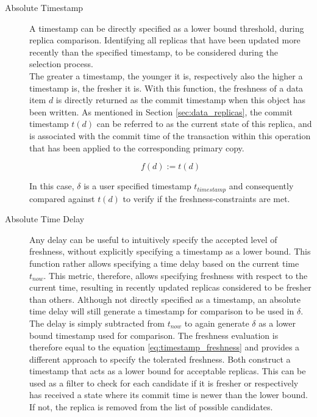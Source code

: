 \begin{description} \label{desc}
    \item [Absolute Timestamp]  A timestamp can be directly specified as a lower bound threshold, during replica comparison. Identifying all replicas that have been updated 
    more recently than the specified timestamp, to be considered during the selection process.\\
    The greater a timestamp, the younger it is, respectively also the higher a timestamp is, the fresher it is.
    With this function, the freshness of a data item $d$ is directly returned as the commit timestamp when this object has been written.
    As mentioned in Section \ref{sec:data_replicas}, the commit timestamp $t(d)$ can be referred to as the current state of this replica, and is associated with the commit time 
    of the transaction within this operation that has been applied to the corresponding primary copy.

    \begin{equation} \label{eq:timestamp_freshness}
        f(d) := t(d)
    \end{equation}

    In this case, $\delta$ is a user specified timestamp $t_{timestamp}$ and consequently compared against $t(d)$ to verify if the freshness-constraints are met.


    \item [Absolute Time Delay] Any delay can be useful to intuitively specify the accepted level of freshness, without explicitly specifying a timestamp as a lower bound.
    This function rather allows specifying a time delay based on the current time $t_{now}$. 
    This metric, therefore, allows specifying freshness with respect to the current time, resulting in recently updated replicas considered to be fresher than others. 
    Although not directly specified as a timestamp, an absolute time delay will still generate a timestamp for comparison to be used in $\delta$.
    The delay is simply subtracted from $t_{now}$ to again generate $\delta$ as a lower bound timestamp used for comparison.
    The freshness evaluation is therefore equal to the equation \ref{eq:timestamp_freshness} and provides a different approach to specify the tolerated freshness.
    Both construct a timestamp that acts as a lower bound for acceptable replicas.
    This can be used as a filter to check for each candidate if it is fresher or respectively has received a state where its commit time is newer 
    than the lower bound. If not, the replica is removed from the list of possible candidates. 




\end{description}

